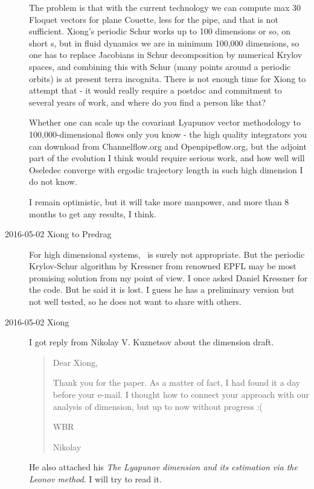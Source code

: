 \begin{description}
The problem is that with the current technology we can compute max 30
Floquet vectors for plane Couette, less for the pipe, and that is not
sufficient. Xiong's periodic Schur works up to 100 dimensions or so, on
short \po s, but in fluid dynamics we are in minimum 100,000 dimensions,
so one has to replace Jacobians in Schur decomposition by numerical
Krylov spaces, and combining this with Schur (many points around a
periodic orbits) is at present terra incognita. There is not enough time
for Xiong to attempt that - it would really require a postdoc and
commitment to several years of work, and where do you find a person like
that?

Whether one can scale up the covariant Lyapunov vector methodology to
100,000-dimensional flows only you know - the high quality integrators
you can download from Channelflow.org and Openpipeflow.org, but the
adjoint part of the evolution I think would require serious work, and how
well will Oseledec converge with ergodic trajectory length in such high
dimension I do not know.

I remain optimistic, but it will take more manpower, and more than 8
months to get any results, I think.

\item[2016-05-02 Xiong to Predrag] For high dimensional systems, \psd\ is
surely not appropriate. But the periodic Krylov-Schur algorithm by
Kressner from renowned EPFL may be most
promising solution from my point of view. I once asked Daniel  Kressner
for the code. But he said it is lost. I guess he has a preliminary
version but not well tested, so he does not want to share with others.

\item[2016-05-02 Xiong] I got reply from Nikolay V. Kuznetsov
about the dimension draft.

  \begin{quotation}
    Dear Xiong,

    Thank you for the paper.
    As a  matter of fact, I had found it a day before your e-mail. I
    thought how to connect your approach with our analysis of dimension,
    but up to now without progress :(

    WBR	

    Nikolay
  \end{quotation}

He also attached his {\em The Lyapunov dimension and its estimation via
the Leonov method}. I will try to read it.


\end{description}
